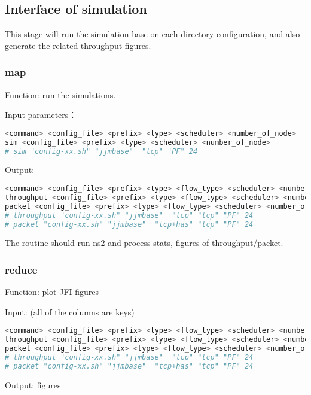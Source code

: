 \subsection{Interface of simulation}

This stage will run the simulation base on each directory configuration,
and also generate the related throughput figures.


\subsubsection{map}
Function: run the simulations.


Input parameters：
\begin{lstlisting}[language=bash]
<command> <config_file> <prefix> <type> <scheduler> <number_of_node>
sim <config_file> <prefix> <type> <scheduler> <number_of_node>
# sim "config-xx.sh" "jjmbase"  "tcp" "PF" 24
\end{lstlisting}


Output:
\begin{lstlisting}[language=bash]
<command> <config_file> <prefix> <type> <flow_type> <scheduler> <number_of_node>
throughput <config_file> <prefix> <type> <flow_type> <scheduler> <number_of_node>
packet <config_file> <prefix> <type> <flow_type> <scheduler> <number_of_node>
# throughput "config-xx.sh" "jjmbase"  "tcp" "tcp" "PF" 24
# packet "config-xx.sh" "jjmbase"  "tcp+has" "tcp" "PF" 24
\end{lstlisting}

The routine should run ns2 and process stats, figures of throughput/packet.




\subsubsection{reduce}
Function: plot JFI figures


Input: (all of the columns are keys)
\begin{lstlisting}[language=bash]
<command> <config_file> <prefix> <type> <flow_type> <scheduler> <number_of_node>
throughput <config_file> <prefix> <type> <flow_type> <scheduler> <number_of_node>
packet <config_file> <prefix> <type> <flow_type> <scheduler> <number_of_node>
# throughput "config-xx.sh" "jjmbase"  "tcp" "tcp" "PF" 24
# packet "config-xx.sh" "jjmbase"  "tcp+has" "tcp" "PF" 24
\end{lstlisting}

Output: figures


